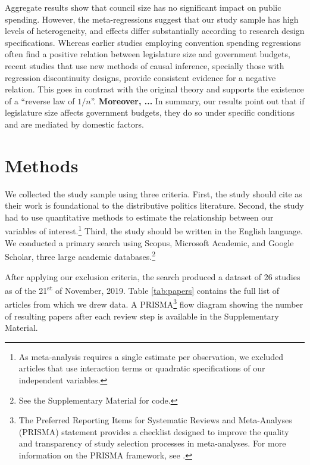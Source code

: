 \documentclass[a4paper,12pt]{article}
\begin{document}
Aggregate results show that council size has no significant impact on public
spending. However, the meta-regressions suggest that our study sample has high
levels of heterogeneity, and effects differ substantially according to research
design specifications. Whereas earlier studies employing convention spending
regressions often find a positive relation between legislature size and
government budgets, recent studies that use new methods of causal inference,
specially those with regression discontinuity designs, provide consistent
evidence for a negative relation. This goes in contrast with the original
theory and supports the existence of a ``reverse law of $1/n$''.
\textbf{Moreover, ...}  In summary, our results point out that if legislature
size affects government budgets, they do so under specific conditions and are
mediated by domestic factors.

\section{Methods}

We collected the study sample using three criteria. First, the study should cite
\citet{weingast1981political} as their work is foundational to the distributive
politics literature. Second, the study had to use quantitative methods to
estimate the relationship between our variables of interest.\footnote{As
meta-analysis requires a single estimate per observation, we excluded articles
that use interaction terms or quadratic specifications of our independent
variables.} Third, the study should be written in the English language. We
conducted a primary search using Scopus, Microsoft Academic, and Google Scholar,
three large academic databases.\footnote{See the Supplementary Material for code.}

After applying our exclusion criteria, the search produced a dataset of 26
studies as of the 21\textsuperscript{st} of November, 2019. Table
\ref{tab:papers} contains the full list of articles from which we drew data. A
PRISMA\footnote{The Preferred Reporting Items for Systematic Reviews and
  Meta-Analyses (PRISMA) statement provides a checklist designed to improve the
quality and transparency of study selection processes in meta-analyses. For more
information on the PRISMA framework, see \citet{liberati2009prisma}.} flow
diagram showing the number of resulting papers after each review step is
available in the Supplementary Material.
\end{document}
